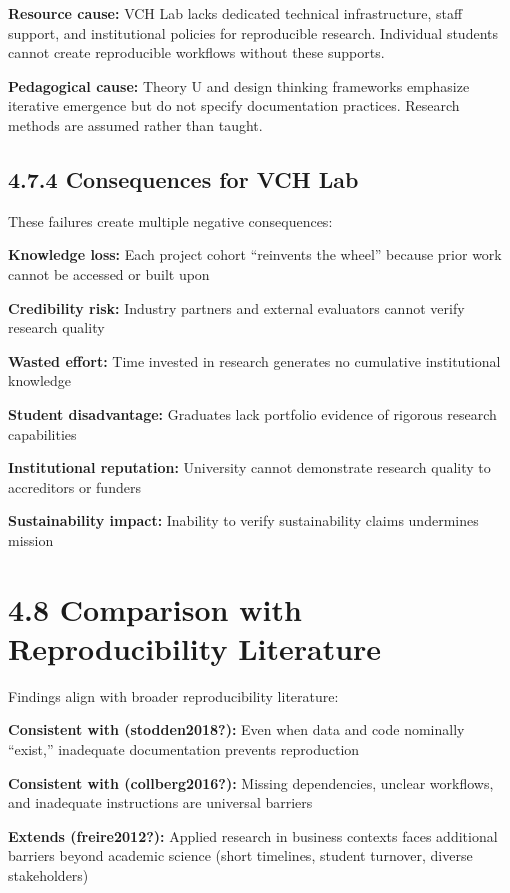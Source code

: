 \documentclass[
  oneside,
  open=any]{scrbook}
\begin{document}
\textbf{Resource cause:} VCH Lab lacks dedicated technical
infrastructure, staff support, and institutional policies for
reproducible research. Individual students cannot create reproducible
workflows without these supports.

\textbf{Pedagogical cause:} Theory U and design thinking frameworks
emphasize iterative emergence but do not specify documentation
practices. Research methods are assumed rather than taught.

\subsection{4.7.4 Consequences for VCH
Lab}\label{consequences-for-vch-lab}

These failures create multiple negative consequences:

\textbf{Knowledge loss:} Each project cohort ``reinvents the wheel''
because prior work cannot be accessed or built upon

\textbf{Credibility risk:} Industry partners and external evaluators
cannot verify research quality

\textbf{Wasted effort:} Time invested in research generates no
cumulative institutional knowledge

\textbf{Student disadvantage:} Graduates lack portfolio evidence of
rigorous research capabilities

\textbf{Institutional reputation:} University cannot demonstrate
research quality to accreditors or funders

\textbf{Sustainability impact:} Inability to verify sustainability
claims undermines mission

\section{4.8 Comparison with Reproducibility
Literature}\label{comparison-with-reproducibility-literature}

Findings align with broader reproducibility literature:

\textbf{Consistent with (\textbf{stodden2018?}):} Even when data and
code nominally ``exist,'' inadequate documentation prevents reproduction

\textbf{Consistent with (\textbf{collberg2016?}):} Missing dependencies,
unclear workflows, and inadequate instructions are universal barriers

\textbf{Extends (\textbf{freire2012?}):} Applied research in business
contexts faces additional barriers beyond academic science (short
timelines, student turnover, diverse stakeholders)
\end{document}

